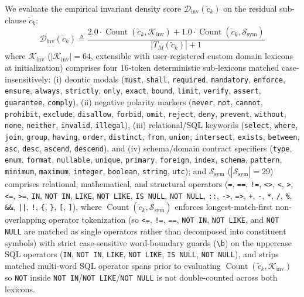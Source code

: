 \documentclass[conference,10pt]{IEEEtran}
\begin{document}
We evaluate the empirical invariant density score $\mathcal{D}_{\text{inv}}(\tilde{c}_k)$ on the residual sub-clause $\tilde{c}_k$:
\begin{equation}
\label{eq:density_score}
\mathcal{D}_{\text{inv}}(\tilde{c}_k) \triangleq \frac{2.0 \cdot \operatorname{Count}(\tilde{c}_k, \mathcal{K}_{\text{inv}}) + 1.0 \cdot \operatorname{Count}(\tilde{c}_k, \mathcal{S}_{\text{sym}})}{|T_M(\tilde{c}_k)| + 1}
\end{equation}
where $\mathcal{K}_{\text{inv}}$ ($|\mathcal{K}_{\text{inv}}| = 64$, extensible with user-registered custom domain lexicons at initialization) comprises four 16-token deterministic sub-lexicons matched case-insensitively: (i) deontic modals (\texttt{must}, \texttt{shall}, \texttt{required}, \texttt{mandatory}, \texttt{enforce}, \texttt{ensure}, \texttt{always}, \texttt{strictly}, \texttt{only}, \texttt{exact}, \texttt{bound}, \texttt{limit}, \texttt{verify}, \texttt{assert}, \texttt{guarantee}, \texttt{comply}), (ii) negative polarity markers (\texttt{never}, \texttt{not}, \texttt{cannot}, \texttt{prohibit}, \texttt{exclude}, \texttt{disallow}, \texttt{forbid}, \texttt{omit}, \texttt{reject}, \texttt{deny}, \texttt{prevent}, \texttt{without}, \texttt{none}, \texttt{neither}, \texttt{invalid}, \texttt{illegal}), (iii) relational/SQL keywords (\texttt{select}, \texttt{where}, \texttt{join}, \texttt{group}, \texttt{having}, \texttt{order}, \texttt{distinct}, \texttt{from}, \texttt{union}, \texttt{intersect}, \texttt{exists}, \texttt{between}, \texttt{asc}, \texttt{desc}, \texttt{ascend}, \texttt{descend}), and (iv) schema/domain contract specifiers (\texttt{type}, \texttt{enum}, \texttt{format}, \texttt{nullable}, \texttt{unique}, \texttt{primary}, \texttt{foreign}, \texttt{index}, \texttt{schema}, \texttt{pattern}, \texttt{minimum}, \texttt{maximum}, \texttt{integer}, \texttt{boolean}, \texttt{string}, \texttt{utc}); and $\mathcal{S}_{\text{sym}}$ ($|\mathcal{S}_{\text{sym}}| = 29$) comprises relational, mathematical, and structural operators (\texttt{=}, \texttt{==}, \texttt{!=}, \texttt{<>}, \texttt{<}, \texttt{>}, \texttt{<=}, \texttt{>=}, \texttt{IN}, \texttt{NOT IN}, \texttt{LIKE}, \texttt{NOT LIKE}, \texttt{IS NULL}, \texttt{NOT NULL}, \texttt{::}, \texttt{->}, \texttt{=>}, \texttt{+}, \texttt{-}, \texttt{*}, \texttt{/}, \texttt{\%}, \texttt{\&\&}, \texttt{||}, \texttt{!}, \texttt{\textquotesingle\{\textquotesingle}, \texttt{\textquotesingle\}\textquotesingle}, \texttt{\textquotesingle[\textquotesingle}, \texttt{\textquotesingle]\textquotesingle}), where $\operatorname{Count}(\tilde{c}_k, \mathcal{S}_{\text{sym}})$ enforces longest-match-first non-overlapping operator tokenization (so \texttt{<=}, \texttt{!=}, \texttt{==}, \texttt{NOT IN}, \texttt{NOT LIKE}, and \texttt{NOT NULL} are matched as single operators rather than decomposed into constituent symbols) with strict case-sensitive word-boundary guards (\texttt{\textbackslash b}) on the uppercase SQL operators (\texttt{IN}, \texttt{NOT IN}, \texttt{LIKE}, \texttt{NOT LIKE}, \texttt{IS NULL}, \texttt{NOT NULL}), and strips matched multi-word SQL operator spans prior to evaluating $\operatorname{Count}(\tilde{c}_k, \mathcal{K}_{\text{inv}})$ so \texttt{NOT} inside \texttt{NOT IN}/\texttt{NOT LIKE}/\texttt{NOT NULL} is not double-counted across both lexicons.
\end{document}
